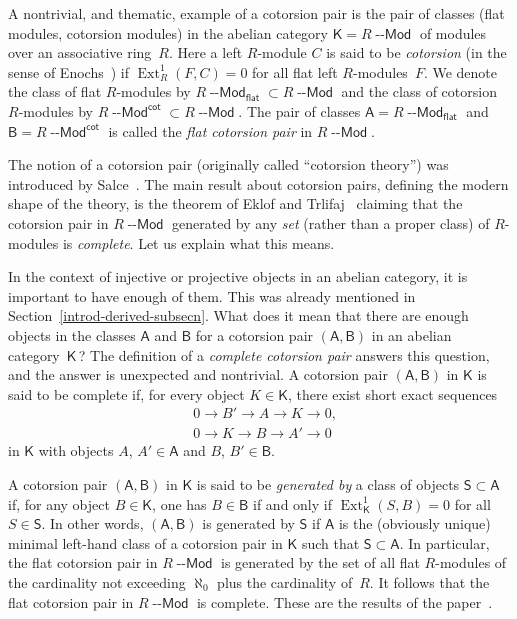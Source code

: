 \documentclass[12pt,a4paper]{amsart}
\newcommand{\+}{\nobreakdash-}
\renewcommand{\:}{\colon}
\newcommand{\rarrow}{\longrightarrow}
\DeclareMathOperator{\Ext}{Ext}
\newcommand{\Modl}{{\operatorname{\mathsf{--Mod}}}}
\newcommand{\sA}{\mathsf A}
\newcommand{\sB}{\mathsf B}
\newcommand{\sK}{\mathsf K}
\newcommand{\sS}{\mathsf S}
\renewcommand{\flat}{\mathsf{flat}}
\renewcommand{\cot}{\mathsf{cot}}
\theoremstyle{plain}
\theoremstyle{definition}
\begin{document}
 A nontrivial, and thematic, example of a cotorsion pair is the pair
of classes (flat modules, cotorsion modules) in the abelian category
$\sK=R\Modl$ of modules over an associative ring~$R$.
 Here a left $R$\+module $C$ is said to be \emph{cotorsion}
(in the sense of Enochs~\cite{En2}) if $\Ext^1_R(F,C)=0$ for all flat
left $R$\+modules~$F$.
 We denote the class of flat $R$\+modules by $R\Modl_\flat\subset
R\Modl$ and the class of cotorsion $R$\+modules by
$R\Modl^\cot\subset R\Modl$.
 The pair of classes $\sA=R\Modl_\flat$ and $\sB=R\Modl^\cot$ is called
the \emph{flat cotorsion pair} in $R\Modl$.

 The notion of a cotorsion pair (originally called ``cotorsion
theory'') was introduced by Salce~\cite{Sal}.
 The main result about cotorsion pairs, defining the modern shape of
the theory, is the theorem of Eklof and Trlifaj~\cite[Theorems~2
and~10]{ET} claiming that the cotorsion pair in $R\Modl$
generated by any \emph{set} (rather than a proper class)
of $R$\+modules is \emph{complete}.
 Let us explain what this means.

 In the context of injective or projective objects in an abelian
category, it is important to have enough of them.
 This was already mentioned in Section~\ref{introd-derived-subsecn}.
 What does it mean that there are enough objects in the classes $\sA$
and $\sB$ for a cotorsion pair $(\sA,\sB)$ in an abelian
category~$\sK$\,?
 The definition of a \emph{complete cotorsion pair} answers this
question, and the answer is unexpected and nontrivial.
 A cotorsion pair $(\sA,\sB)$ in $\sK$ is said to be complete if,
for every object $K\in\sK$, there exist short exact sequences
\begin{align*}
 & 0\rarrow B'\rarrow A\rarrow K\rarrow 0, \\
 & 0\rarrow K\rarrow B\rarrow A'\rarrow 0
\end{align*}
in $\sK$ with objects $A$, $A'\in\sA$ and $B$, $B'\in\sB$.

 A cotorsion pair $(\sA,\sB)$ in $\sK$ is said to be \emph{generated
by} a class of objects $\sS\subset\sA$ if, for any object $B\in\sK$,
one has $B\in\sB$ if and only if $\Ext^1_\sK(S,B)=0$ for all $S\in\sS$.
 In other words, $(\sA,\sB)$ is generated by $\sS$ if $\sA$ is
the (obviously unique) minimal left-hand class of a cotorsion pair
in $\sK$ such that $\sS\subset\sA$.
 In particular, the flat cotorsion pair in $R\Modl$ is generated
by the set of all flat $R$\+modules of the cardinality not exceeding
$\aleph_0$ plus the cardinality of~$R$.
 It follows that the flat cotorsion pair in $R\Modl$ is complete.
 These are the results of the paper~\cite[Section~2]{BBE}.
\end{document}
